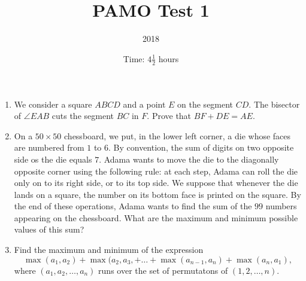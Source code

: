 \documentclass{article}
\title{PAMO Test 1}
\author{2018}
\date{Time: $4\frac{1}{2}$ hours}
\begin{document}
\maketitle

\begin{enumerate}

\item %
We consider a square $ABCD$ and a point $E$ on the segment $CD$. The bisector of
$\angle EAB$ cuts the segment $BC$ in $F$. Prove that $BF + DE = AE$.

\item %
On a $50 \times 50$ chessboard, we put, in the lower left corner, a die whose
faces are numbered from $1$ to $6$. By convention, the sum of digits on two
opposite side os the die equals $7$. Adama wants to move the die to the
diagonally opposite corner using the following rule: at each step, Adama can
roll the die only on to its right side, or to its top side. We suppose that
whenever the die lands on a square, the number on its bottom face is printed on
the square. By the end of these operations, Adama wants to find the sum of the
$99$ numbers appearing on the chessboard. What are the maximum and minimum
possible values of this sum?

\item %
Find the maximum and minimum of the expression
\[
  \max(a_1, a_2) + \max(a_2, a_3, + \dots + \max(a_{n-1}, a_n) + \max(a_n, a_1),
\]
where $(a_1, a_2, \dots, a_n)$ runs over the set of permutatons of $(1, 2,
\dots, n)$.

\end{enumerate}
\end{document}
